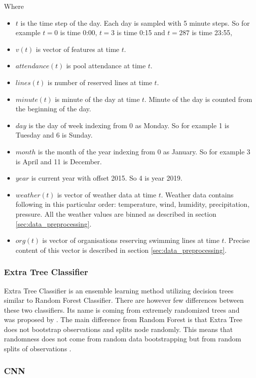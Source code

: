 \documentclass{article}
\begin{document}
Where 
\begin{itemize}
    \item $t$ is the time step of the day. Each day is sampled with 5 minute steps. So for example $t = 0$ is time 0:00, $t = 3$ is time 0:15 and $t = 287$ is time 23:55, 
    \item $v(t)$ is vector of features at time $t$.
    \item $attendance(t)$ is pool attendance at time $t$.
    \item $lines(t)$ is number of reserved lines at time $t$.
    \item $minute(t)$ is minute of the day at time $t$. Minute of the day is counted from the beginning of the day.
    \item $day$ is the day of week indexing from 0 as Monday. So for example 1 is Tuesday and 6 is Sunday.
    \item $month$ is the month of the year indexing from 0 as January. So for example 3 is April and 11 is December.
    \item $year$ is current year with offset 2015. So 4 is year 2019.
    \item $weather(t)$ is vector of weather data at time $t$. Weather data contains following in this particular order: temperature, wind, humidity, precipitation, pressure. All the weather values are binned as described in section \ref{sec:data_preprocessing}.
    \item $org(t)$ is  vector of organisations reserving swimming lines at time $t$. Precise content of this vector is described in section \ref{sec:data_preprocessing}.
\end{itemize}

\subsubsection{Extra Tree Classifier}
Extra Tree Classifier is an ensemble learning method utilizing decision trees similar to Random Forest Classifier. There are however few differences between these two classifiers. Its name is coming from extremely randomized trees and was proposed by \citep{geurts206extratree}. The main difference from Random Forest is that Extra Tree does not bootstrap observations and splits node randomly. This means that randomness does not come from random data bootstrapping but from random splits of observations \citep{bhandari2019extratree}.

\subsubsection{CNN}
\end{document}
